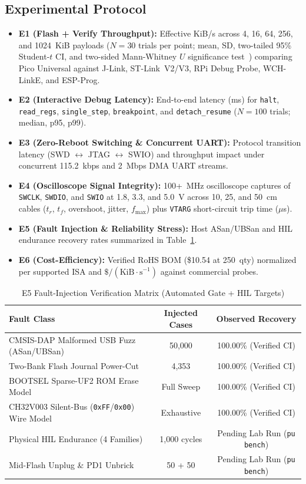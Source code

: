 \documentclass[journal]{IEEEtran}
\begin{document}
\subsection{Experimental Protocol}
\begin{itemize}
  \item \textbf{E1 (Flash + Verify Throughput):} Effective KiB/s across 4, 16, 64, 256, and 1024~KiB payloads ($N=30$ trials per point; mean, SD, two-tailed 95\% Student-$t$ CI, and two-sided Mann-Whitney $U$ significance test~\cite{mann_whitney_1947}) comparing Pico Universal against J-Link, ST-Link~V2/V3, RPi Debug Probe, WCH-LinkE, and ESP-Prog.
  \item \textbf{E2 (Interactive Debug Latency):} End-to-end latency (ms) for \texttt{halt}, \texttt{read\_regs}, \texttt{single\_step}, \texttt{breakpoint}, and \texttt{detach\_resume} ($N=100$ trials; median, p95, p99).
  \item \textbf{E3 (Zero-Reboot Switching \& Concurrent UART):} Protocol transition latency (SWD $\leftrightarrow$ JTAG $\leftrightarrow$ SWIO) and throughput impact under concurrent 115.2~kbps and 2~Mbps DMA UART streams.
  \item \textbf{E4 (Oscilloscope Signal Integrity):} 100+~MHz oscilloscope captures of \texttt{SWCLK}, \texttt{SWDIO}, and \texttt{SWIO} at 1.8, 3.3, and 5.0~V across 10, 25, and 50~cm cables ($t_r$, $t_f$, overshoot, jitter, $f_{\max}$) plus \texttt{VTARG} short-circuit trip time ($\mu$s).
  \item \textbf{E5 (Fault Injection \& Reliability Stress):} Host ASan/UBSan and HIL endurance recovery rates summarized in Table~\ref{tab:e5_faults}.
  \item \textbf{E6 (Cost-Efficiency):} Verified RoHS BOM (\$10.54 at 250~qty) normalized per supported ISA and $\$/(\text{KiB}\cdot\text{s}^{-1})$ against commercial probes.
\end{itemize}

\begin{table}[t]
\centering
\caption{E5 Fault-Injection Verification Matrix (Automated Gate + HIL Targets)}
\label{tab:e5_faults}
\begin{tabular}{@{}lcc@{}}
\toprule
\textbf{Fault Class} & \textbf{Injected Cases} & \textbf{Observed Recovery} \\
\midrule
CMSIS-DAP Malformed USB Fuzz (ASan/UBSan) & 50,000 & 100.00\% (Verified CI) \\
Two-Bank Flash Journal Power-Cut & 4,353 & 100.00\% (Verified CI) \\
BOOTSEL Sparse-UF2 ROM Erase Model & Full Sweep & 100.00\% (Verified CI) \\
CH32V003 Silent-Bus (\texttt{0xFF}/\texttt{0x00}) Wire Model & Exhaustive & 100.00\% (Verified CI) \\
Physical HIL Endurance (4 Families) & 1,000 cycles & Pending Lab Run (\texttt{pu bench}) \\
Mid-Flash Unplug \& PD1 Unbrick & 50 + 50 & Pending Lab Run (\texttt{pu bench}) \\
\bottomrule
\end{tabular}
\end{table}
\end{document}
